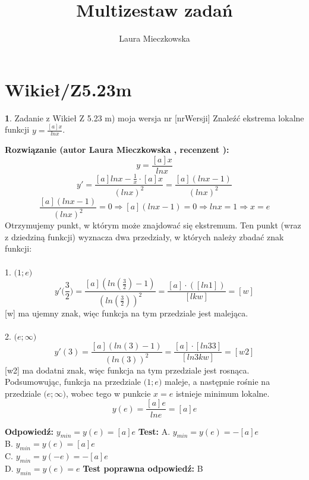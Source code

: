 \documentclass[12pt, a4paper]{article}
\title{Multizestaw zadań}
\author{Laura Mieczkowska}
\date{}
\theoremstyle{definition} %
\newtheorem{zad}{}
\newcommand{\kategoria}[1]{\section{#1}} %
\newcommand{\zadStart}[1]{\begin{zad}#1\newline} %
\newcommand{\zadStop}{\end{zad}}   %
\newcommand{\rozwStart}[2]{\noindent \textbf{Rozwiązanie (autor #1 , recenzent #2): }\newline} %
\newcommand{\odpStart}{\noindent \textbf{Odpowiedź:}\newline}    %
\newcommand{\odpStop}{\newline}                                             %
\newcommand{\testStart}{\noindent \textbf{Test:}\newline} %
\newcommand{\testStop}{\newline} %
\newcommand{\kluczStart}{\noindent \textbf{Test poprawna odpowiedź:}\newline} %
\newcommand{\kluczStop}{\newline} %
\begin{document}
\maketitle


\kategoria{Wikieł/Z5.23m}
\zadStart{Zadanie z Wikieł Z 5.23 m) moja wersja nr [nrWersji]}
Znaleźć ekstrema lokalne funkcji $y=\frac{[a]x}{lnx}$.
\zadStop
\rozwStart{Laura Mieczkowska}{}
$$y=\frac{[a]x}{lnx}$$
$$y'=\frac{[a]lnx-\frac{1}{x}\cdot [a]x}{(lnx)^2}=\frac{[a](lnx-1)}{(lnx)^2}$$
$$\frac{[a](lnx-1)}{(lnx)^2}=0 \Rightarrow [a](lnx-1)=0 \Rightarrow lnx=1 \Rightarrow x=e$$
Otrzymujemy punkt, w którym może znajdować się ekstremum. Ten punkt (wraz z dziedziną funkcji) wyznacza dwa przedziały, w których należy zbadać znak funkcji:
\\\\1. $\big(1;e\big)$
$$y'\bigg(\frac{3}{2}\bigg)=\frac{[a](ln(\frac{3}{2})-1)}{(ln(\frac{3}{2}))^2}=\frac{[a]\cdot([ln1])}{[lkw]}=[w]$$
[w] ma ujemny znak, więc funkcja na tym przedziale jest malejąca.
\\\\2. $\big(e;\infty\big)$
$$y'(3)=\frac{[a](ln(3)-1)}{(ln(3))^2}=\frac{[a]\cdot[ln33]}{[ln3kw]}=[w2]$$
[w2] ma dodatni znak, więc funkcja na tym przedziale jest rosnąca.
\\Podsumowując, funkcja na przedziale $\big(1;e\big)$ maleje, a następnie rośnie na przedziale $\big(e;\infty\big)$, wobec tego w punkcie $x=e$ istnieje minimum lokalne.
$$y(e)=\frac{[a]e}{lne}=[a]e$$

\odpStart
$y_{min}=y(e)=[a]e$
\odpStop
\testStart
A. $y_{min}=y(e)=-[a]e$\\
B. $y_{min}=y(e)=[a]e$ \\
C. $y_{min}=y(-e)=-[a]e$ \\
D. $y_{min}=y(e)=e$ 
\testStop
\kluczStart
B
\kluczStop
\end{document}
